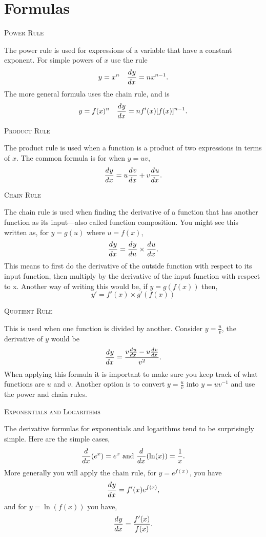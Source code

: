 \documentclass[a4paper,10pt]{article}
\newcommand{\deriv}[3][ ]{\ensuremath\frac{d^{#1}#2}{d#3^{#1}}}
\newcommand{\derivof}[2][ ]{\ensuremath\frac{d^{#1}}{d#2^{#1}}}
\begin{document}
\section*{Formulas}
\begin{multicols*}{2}
{\large\textsc{Power Rule}}

The power rule is used for expressions of a variable that have a constant 
exponent. For simple powers of $x$ use the rule 
$$y = x^n \quad \deriv{y}{x} = nx^{n-1}.$$
The more general formula uses the chain rule, and is
$$y = f(x)^n \quad \deriv{y}{x} = nf'(x)[f(x)]^{n-1}.$$

{\large\textsc{Product Rule}}

The product rule is used when a function is a product of two expressions 
in terms of $x$. The common formula is for when $y = uv$,
$$\deriv{y}{x} = u\deriv{v}{x} + v\deriv{u}{x}.$$

{\large\textsc{Chain Rule}}

The chain rule is used when finding the derivative of a function that 
has another function as its input---also called function composition.
You might see this written as, for $y = g(u)$ where $u = f(x)$, 
$$\deriv{y}{x} = \deriv{y}{u} \times \deriv{u}{x}.$$
This means to first do the derivative of the outside function with 
respect to its input function, then multiply by the derivative of the 
input function with respect to x. Another way of writing this would 
be, if $y = g(f(x))$ then,
$$y' = f'(x) \times g'(f(x))$$

{\large\textsc{Quotient Rule}}

This is used when one function is divided by another. Consider
$y = \frac{u}{v}$, the derivative of $y$ would be 
$$\deriv{y}{x} = \frac{v\deriv{u}{x} - u\deriv{v}{x}}{v^2}.$$
When applying this formula it is important to make sure you 
keep track of what functions are $u$ and $v$. Another option is to 
convert $y = \frac{u}{v}$ into $y = uv^{-1}$ and use the power 
and chain rules.

{\large\textsc{Exponentials and Logarithms}}

The derivative formulas for exponentials and logarithms tend to be 
surprisingly simple. Here are the simple cases, 
$$\derivof{x}(e^x) = e^x \textrm{~and~} \derivof{x}(\ln(x)) = \frac{1}{x}.$$
More generally you will apply the chain rule, for $y = e^{f(x)}$, you have 
$$\deriv{y}{x} = f'(x)e^{f(x)},$$
and for $y = \ln(f(x))$ you have,
$$\deriv{y}{x} = \frac{f'(x)}{f(x)}.$$



\end{multicols*}
\end{document}
